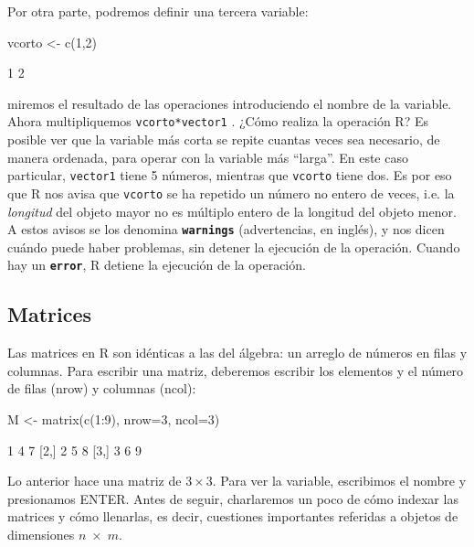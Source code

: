 \documentclass[11pt,a4paper]{article}
\begin{document}
Por otra parte, podremos definir una tercera variable:
\begin{Schunk}
\begin{Sinput}
vcorto <- c(1,2)
\end{Sinput}
\begin{Soutput}
[1] 1 2
\end{Soutput}
\end{Schunk}

\noindent  miremos el resultado de las operaciones introduciendo el nombre de la variable. Ahora multipliquemos \texttt{vcorto*vector1} . ¿Cómo realiza la operación R? Es posible ver que la variable más corta se repite cuantas veces sea necesario, de manera ordenada, para operar con la variable más ``larga''. En este caso particular, \texttt{vector1} tiene 5 números, mientras que \texttt{vcorto} tiene dos. Es por eso que R nos avisa que \texttt{vcorto} se ha repetido un número no entero de veces, i.e. la \textit{longitud} del objeto mayor no es múltiplo entero de la longitud del objeto menor. A estos avisos se los denomina \texttt{\textbf{warnings}} (advertencias, en inglés), y nos dicen cuándo puede haber problemas, sin detener la ejecución de la operación. Cuando hay un \texttt{\textbf{error}}, R detiene la ejecución de la operación.


\subsection{Matrices}

Las matrices en R son idénticas a las del álgebra: un arreglo de números en filas y columnas. Para escribir una matriz, deberemos escribir los elementos y el número de filas (nrow) y columnas (ncol):

\begin{Schunk}
\begin{Sinput}
M <- matrix(c(1:9), nrow=3, ncol=3)
\end{Sinput}
\begin{Soutput}
       [,1] [,2] [,3]
[1,]    1    4    7
[2,]    2    5    8
[3,]    3    6    9
\end{Soutput}
\end{Schunk}

Lo anterior hace una matriz de $3\times 3$. Para ver la variable, escribimos el nombre y presionamos ENTER. Antes de seguir, charlaremos un poco de cómo indexar las matrices y cómo llenarlas, es decir, cuestiones importantes referidas a objetos de dimensiones $n \; \times \;m$.
\end{document}
